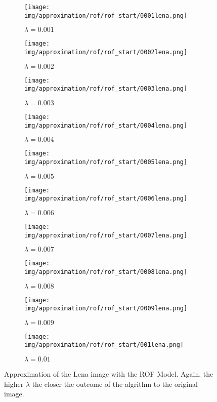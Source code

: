         \begin{figure}[ht]
            \centering
            \begin{subfigure}[b]{0.18\textwidth}
                \texttt{[image: img/approximation/rof/rof\_start/0001lena.png]}
                \caption{$\lambda = 0.001$}
            \end{subfigure}
            \begin{subfigure}[b]{0.18\textwidth}
                \texttt{[image: img/approximation/rof/rof\_start/0002lena.png]}
                \caption{$\lambda = 0.002$}
            \end{subfigure}
            \begin{subfigure}[b]{0.18\textwidth}
                \texttt{[image: img/approximation/rof/rof\_start/0003lena.png]}
                \caption{$\lambda = 0.003$}
            \end{subfigure}
            \begin{subfigure}[b]{0.18\textwidth}
                \texttt{[image: img/approximation/rof/rof\_start/0004lena.png]}
                \caption{$\lambda = 0.004$}
            \end{subfigure}
            \begin{subfigure}[b]{0.18\textwidth}
                \texttt{[image: img/approximation/rof/rof\_start/0005lena.png]}
                \caption{$\lambda = 0.005$}
            \end{subfigure}
            \begin{subfigure}[b]{0.18\textwidth}
                \texttt{[image: img/approximation/rof/rof\_start/0006lena.png]}
                \caption{$\lambda = 0.006$}
            \end{subfigure}
            \begin{subfigure}[b]{0.18\textwidth}
                \texttt{[image: img/approximation/rof/rof\_start/0007lena.png]}
                \caption{$\lambda = 0.007$}
            \end{subfigure}
            \begin{subfigure}[b]{0.18\textwidth}
                \texttt{[image: img/approximation/rof/rof\_start/0008lena.png]}
                \caption{$\lambda = 0.008$}
            \end{subfigure}
            \begin{subfigure}[b]{0.18\textwidth}
                \texttt{[image: img/approximation/rof/rof\_start/0009lena.png]}
                \caption{$\lambda = 0.009$}
            \end{subfigure}
            \begin{subfigure}[b]{0.18\textwidth}
                \texttt{[image: img/approximation/rof/rof\_start/001lena.png]}
                \caption{$\lambda = 0.01$}
            \end{subfigure}
            \caption{Approximation of the Lena image with the ROF Model. Again, the higher $\lambda$ the closer the outcome of the algrithm to the original image.}
        \label{fig:rof_lena_first_compare}
        \end{figure}


